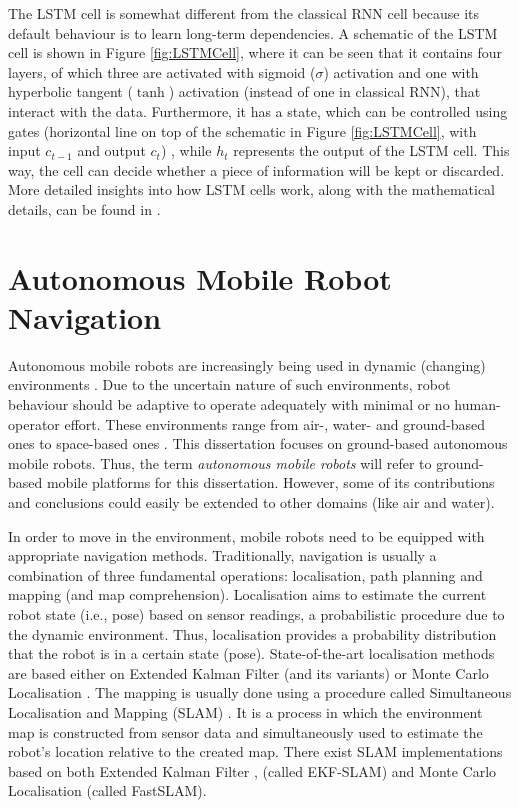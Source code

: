 The LSTM cell is somewhat different from the classical RNN cell because its default behaviour is to learn long-term dependencies. A schematic of the LSTM cell is shown in Figure \ref{fig:LSTMCell}, where it can be seen that it contains four layers, of which three are activated with sigmoid ($\sigma$) activation and one with hyperbolic tangent ($\tanh$) activation (instead of one in classical RNN), that interact with the data. Furthermore, it has a state, which can be controlled using gates (horizontal line on top of the schematic in Figure \ref{fig:LSTMCell}, with input $c_{t-1}$ and output $c_t$) , while $h_t$ represents the output of the LSTM cell. This way, the cell can decide whether a piece of information will be kept or discarded. More detailed insights into how LSTM cells work, along with the mathematical details, can be found in \cite{Olah2015}.

\section{Autonomous Mobile Robot Navigation}

Autonomous mobile robots are increasingly being used in dynamic (changing) environments \cite{Kunze2018,Guiochet2017,Ramachandram2017,BoninFont2008,Jarvis2008}. Due to the uncertain nature of such environments, robot behaviour should be adaptive to operate adequately with minimal or no human-operator effort. These environments range from air-, water- and ground-based ones to space-based ones \cite{Kunze2018,BoninFont2008}. This dissertation focuses on ground-based autonomous mobile robots. Thus, the term \emph{autonomous mobile robots} will refer to ground-based mobile platforms for this dissertation. However, some of its contributions and conclusions could easily be extended to other domains (like air and water).

In order to move in the environment, mobile robots need to be equipped with appropriate navigation methods. Traditionally, navigation is usually a combination of three fundamental operations: localisation, path planning and mapping (and map comprehension). Localisation aims to estimate the current robot state (i.e., pose) based on sensor readings, a probabilistic procedure due to the dynamic environment. Thus, localisation provides a probability distribution that the robot is in a certain state (pose). State-of-the-art localisation methods are based either on Extended Kalman Filter \cite{Jetto1999,Moore2015} (and its variants) or Monte Carlo Localisation \cite{Dellaert1999,Thrun2006}. The mapping is usually done using a procedure called Simultaneous Localisation and Mapping (SLAM) \cite{Leonard1991,DurrantWhyte2006}. It is a process in which the environment map is constructed from sensor data and simultaneously used to estimate the robot's location relative to the created map. There exist SLAM implementations based on both Extended Kalman Filter \cite{Dissanayake2001,Leonard2000,Guivant2001}, (called EKF-SLAM) and Monte Carlo Localisation \cite{Montemerlo2002,Montemerlo2003} (called FastSLAM).

